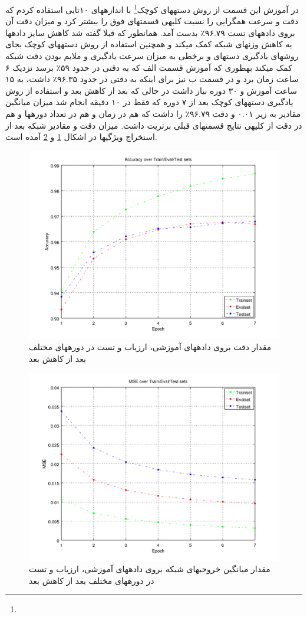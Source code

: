 \documentclass[10pt,a4paper]{article}
\newcommand{\نیمفاصله}{\halfspace}
\renewcommand{\ }{\halfspace}
\newcommand{\بپ}{انتشار-به-عقب }
\newcommand{\منست}{\lr{MNIST} }
\newcommand{\مسی}{\lr{MSE} }
\newcommand{\فوتنت}[1]{\footnote{\lr{#1}}}
\begin{document}
در آموزش این قسمت از روش دسته\ های کوچک\فوتنت{Mini-Batch} با اندازه\ های ۱۰تایی استفاده کردم که دقت و سرعت همگرایی را نسبت کلیه\ ی قسمت\ های فوق را بیشتر کرد و میزان دقت آن بروی داده\ های تست ۹۶.۷۹٪ بدست آمد. همان\ طور که قبلا گفته شد کاهش سایز داده\ ها به کاهش وزن\ های شبکه کمک می\ کند و همچنین استفاده از روش دسته\ های کوچک بجای روش\ های یادگیری دسته\ ای و برخطی به میزان سرعت یادگیری و ملایم بودن دقت شبکه کمک میکند به\ طوری که آموزش قسمت الف که به دقتی در حدود ۵۹٪ برسد نزدیک ۶ ساعت زمان برد و در قسمت ب نیز برای اینکه به دقتی در حدود ۹۶.۳۵٪ داشت، به ۱۵ ساعت آموزش  و ۳۰ دوره نیاز داشت در حالی که بعد از کاهش بعد و استفاده از روش یادگیری دسته\ های کوچک بعد از ۷ دوره که فقط در ۱۰ دقیقه انجام شد میزان میانگین مقادیر \مسی به زیر ۰.۰۱ و دقت ۹۶.۷۹٪ را داشت که هم در زمان و هم در تعداد دوره\ ها و هم در دقت از کلیه\ ی نتایج قسمت\ های قبلی برتریت داشت. میزان دقت و مقادیر \مسی شبکه بعد از استخراج ویژگی\ ها در اشکال
\ref{fig:section_e_pca_acc} و \ref{fig:section_e_pca_mse}
آمده است.
\begin{figure}[t!]
\centering
\includegraphics[width=.9\textwidth]{5_pca_acc}
\caption{مقدار دقت بروی داده\ های آموزشی، ارزیاب و تست در دوره\ های مختلف بعد از کاهش بعد}\label{fig:section_e_pca_acc}
\end{figure}
\begin{figure}[t!]
\centering
\includegraphics[width=.9\textwidth]{5_pca_mse}
\caption{مقدار میانگین \مسی خروجی\ های شبکه بروی داده\ های آموزشی، ارزیاب و تست در دوره\ های مختلف بعد از کاهش بعد}\label{fig:section_e_pca_mse}
\end{figure}
\end{document}
